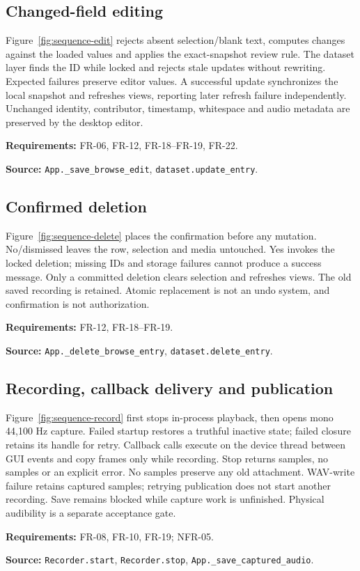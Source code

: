 \documentclass[11pt,a4paper]{article}
\newcommand{\viewtrace}[2]{\par\smallskip\noindent\textbf{Requirements:} #1.\par
  \noindent\textbf{Source:} #2.\par\medskip}
\begin{document}
\subsection{Changed-field editing}
Figure~\ref{fig:sequence-edit} rejects absent selection/blank text, computes
changes against the loaded values and applies the exact-snapshot review rule.
The dataset layer finds the ID while locked and rejects stale updates without
rewriting. Expected failures preserve editor values. A successful update
synchronizes the local snapshot and refreshes views, reporting later refresh
failure independently. Unchanged identity, contributor, timestamp, whitespace
and audio metadata are preserved by the desktop editor.
\viewtrace{FR-06, FR-12, FR-18--FR-19, FR-22}
{\nolinkurl{App._save_browse_edit}, \nolinkurl{dataset.update_entry}}

\subsection{Confirmed deletion}
Figure~\ref{fig:sequence-delete} places the confirmation before any mutation.
No/dismissed leaves the row, selection and media untouched. Yes invokes the
locked deletion; missing IDs and storage failures cannot produce a success
message. Only a committed deletion clears selection and refreshes views.
The old saved recording is retained. Atomic replacement is not an undo system,
and confirmation is not authorization.
\viewtrace{FR-12, FR-18--FR-19}{\nolinkurl{App._delete_browse_entry}, \nolinkurl{dataset.delete_entry}}

\subsection{Recording, callback delivery and publication}
Figure~\ref{fig:sequence-record} first stops in-process playback, then opens
mono 44,100 Hz capture. Failed startup restores a truthful inactive state;
failed closure retains its handle for retry. Callback calls execute on the
device thread between GUI events and copy frames only while recording.
Stop returns samples, no samples or an explicit error. No samples preserve
any old attachment. WAV-write failure retains captured samples; retrying
publication does not start another recording. Save remains blocked while
capture work is unfinished. Physical audibility is a separate acceptance gate.
\viewtrace{FR-08, FR-10, FR-19; NFR-05}
{\nolinkurl{Recorder.start}, \nolinkurl{Recorder.stop}, \nolinkurl{App._save_captured_audio}}
\end{document}
